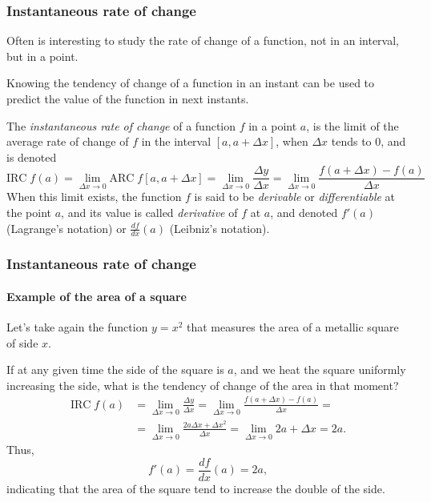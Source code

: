 \begin{frame}
\frametitle{Instantaneous rate of change}
Often is interesting to study the rate of change of a function, not in an interval, but in a point.

Knowing the tendency of change of a function in an instant can be used to predict the value of the function in next instants.

\begin{definition}
The \emph{instantaneous rate of change} of a function $f$ in a point $a$, is the limit of the average rate of change of $f$ in the interval $[a,a+\Delta x]$, when $\Delta x$ tends to 0, and is denoted
\[
\textrm{IRC}\;f (a)=\lim_{\Delta x\rightarrow 0} \textrm{ARC}\; f[a,a+\Delta x]=\lim_{\Delta x\rightarrow 0}\frac{\Delta y}{\Delta x}=\lim_{\Delta x\rightarrow 0}\frac{f(a+\Delta x)-f(a)}{\Delta x}
\]
When this limit exists, the function $f$ is said to be \emph{derivable} or \emph{differentiable} at the point $a$, and its value is called \emph{derivative} of $f$ at $a$, and denoted $f'(a)$ (Lagrange's notation) or $\frac{df}{dx}(a)$ (Leibniz's notation).
\end{definition}
\end{frame}


\begin{frame}
\frametitle{Instantaneous rate of change}
\framesubtitle{Example of the area of a square}
Let's take again the function $y=x^2$ that measures the area of a metallic square of side $x$.

If at any given time the side of the square is $a$, and we heat the square uniformly increasing the side, what is the tendency of change of the area in that moment?
\begin{align*}
\textrm{IRC}\;f(a)&=\lim_{\Delta x\rightarrow 0}\frac{\Delta y}{\Delta x}=\lim_{\Delta x\rightarrow 0}\frac{f(a+\Delta x)-f(a)}{\Delta x} =\\
&=\lim_{\Delta x\rightarrow 0}\frac{2a\Delta x+\Delta x^2}{\Delta x}=\lim_{\Delta x\rightarrow 0} 2a+\Delta x= 2a.
\end{align*}
Thus,
\[
f'(a)=\frac{df}{dx}(a)=2a,
\]
indicating that the area of the square tend to increase the double of the side.
\end{frame}


